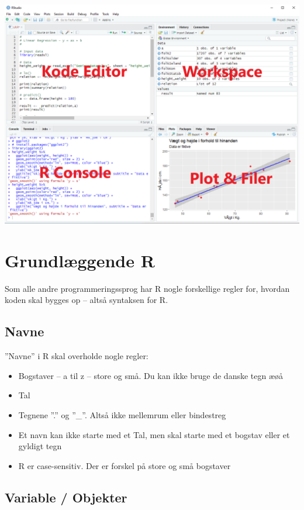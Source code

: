\documentclass[
]{book}
\providecommand{\tightlist}{%
  \setlength{\itemsep}{0pt}\setlength{\parskip}{0pt}}
\begin{document}
\includegraphics{img/rstudio_editor.png}

\hypertarget{grund}{%
\chapter{Grundlæggende R}\label{grund}}

Som alle andre programmeringssprog har R nogle forskellige regler for, hvordan koden skal bygges op -- altså syntaksen for R.

\hypertarget{navne}{%
\section{Navne}\label{navne}}

''Navne'' i R skal overholde nogle regler:

\begin{itemize}
\tightlist
\item
  Bogstaver -- a til z -- store og små. Du kan ikke bruge de danske tegn æøå
\item
  Tal
\item
  Tegnene ''.'' og ''\_''. Altså ikke mellemrum eller bindestreg
\item
  Et navn kan ikke starte med et Tal, men skal starte med et bogstav eller et gyldigt tegn
\item
  R er case-sensitiv. Der er forskel på store og små bogstaver
\end{itemize}

\hypertarget{variable-objekter}{%
\section{Variable / Objekter}\label{variable-objekter}}
\end{document}
